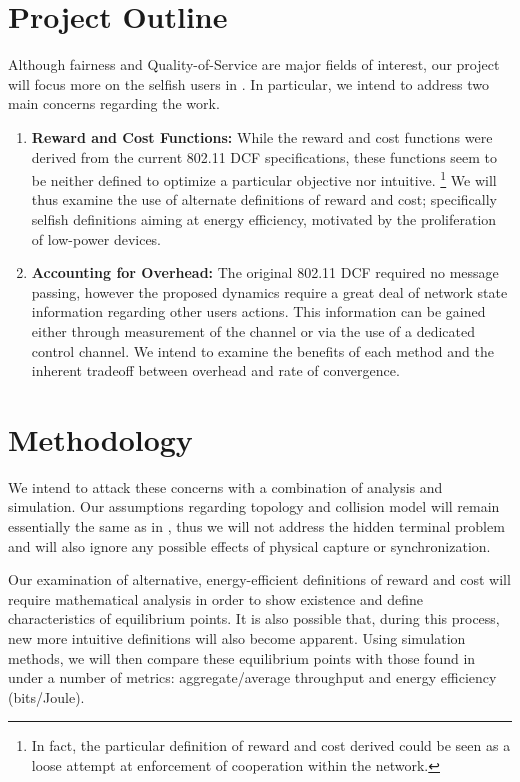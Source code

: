 \documentclass[conference]{IEEEtran}
\begin{document}
\section{Project Outline}
Although fairness and Quality-of-Service are major fields of interest, our project will focus more on the selfish users in \cite{LTHCC07}. In particular, we intend to address two main concerns regarding the work. 
\begin{enumerate}
	\item {\bf Reward and Cost Functions: }
		While the reward and cost functions were derived from the current 802.11 DCF specifications, these functions seem to be neither defined to optimize a particular objective nor intuitive.
		\footnote{In fact, the particular definition of reward and cost derived could be seen as a loose attempt at enforcement of cooperation within the network.} 
		We will thus examine the use of alternate definitions of reward and cost; specifically selfish definitions aiming at energy efficiency, motivated by the proliferation of low-power devices.
	\item {\bf Accounting for Overhead: }
		The original 802.11 DCF required no message passing, however the proposed dynamics require a great deal of network state information regarding other users actions. This information can be gained either through measurement of the channel or via the use of a dedicated control channel. We intend to examine the benefits of each method and the inherent tradeoff between overhead and rate of convergence.
\end{enumerate}

\section{Methodology}
We intend to attack these concerns with a combination of analysis and simulation. Our assumptions regarding topology and collision model will remain essentially the same as in \cite{LTHCC07}, thus we will not address the hidden terminal problem and will also ignore any possible effects of physical capture or synchronization. 

Our examination of alternative, energy-efficient definitions of reward and cost will require mathematical analysis in order to show existence and define characteristics of equilibrium points. It is also possible that, during this process, new more intuitive definitions will also become apparent. Using simulation methods, we will then compare these equilibrium points with those found in \cite{LTHCC07} under a number of metrics: aggregate/average throughput and energy efficiency (bits/Joule). 
\end{document}
